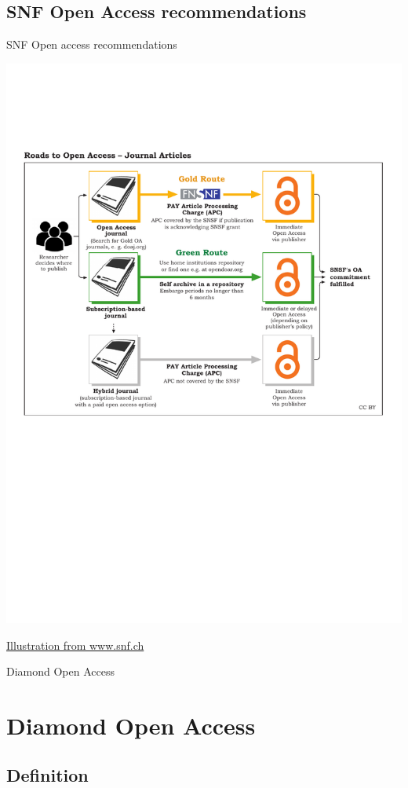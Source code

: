 \documentclass[10pt,compress,serif,aspectratio=169]{beamer}
\begin{document}
\subsection{SNF Open Access recommendations}
\begin{frame}[t]{SNF Open access recommendations}

  \begin{center}
    \includegraphics[width=.65\textwidth]{SNSF_Roads_to_OA_Articles}
  \end{center}
  \href{https://www.snf.ch/en/VyUvGzptStOEpUoC/topic/open-access-to-publications}{Illustration from www.snf.ch}
\end{frame}



\begin{frame}[t]
  \begin{center}
  \vspace{3cm}
  {\huge Diamond Open Access}\\
  \end{center}
\end{frame}


\section{Diamond Open Access}
\subsection{Definition}
\end{document}
